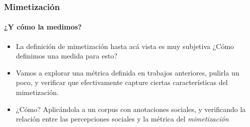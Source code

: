 \begin{frame}
  \frametitle{Mimetización}
  \framesubtitle{¿Y cómo la medimos?}

  \begin{itemize}
    \item La definición de mimetización hasta acá vista es muy subjetiva ¿Cómo definimos una medida para esto?
    \item Vamos a explorar una métrica definida en trabajos anteriores, pulirla un poco, y verificar que efectivamente capture ciertas características del mimetización.
    \item ¿Cómo? Aplicándola a un corpus con anotaciones sociales, y verificando la relación entre las percepciones sociales y la métrica del \emph{mimetización}
  \end{itemize}


\end{frame}
